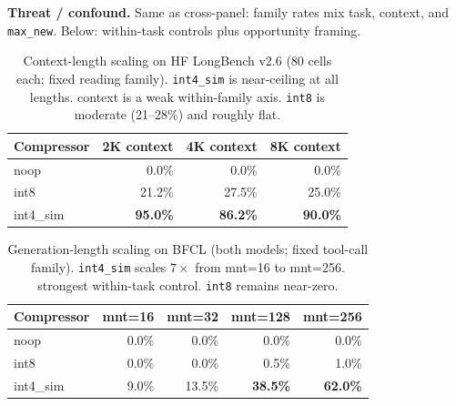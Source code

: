 \documentclass[11pt]{article}
\begin{document}
\noindent\textbf{Threat / confound.} Same as cross-panel: family rates mix task, context,
and \texttt{max\_new}. Below: within-task controls plus opportunity framing.

\begin{table}[htbp]
\centering\small\setlength\tabcolsep{4pt}
\renewcommand{\arraystretch}{1.05}
\begin{tabular}{lrrr}
\toprule
\textbf{Compressor} & \textbf{2K context} & \textbf{4K context} & \textbf{8K context} \\
\midrule
noop      &  0.0\% &  0.0\% &  0.0\% \\
int8      & 21.2\% & 27.5\% & 25.0\% \\
int4\_sim & \textbf{95.0\%} & \textbf{86.2\%} & \textbf{90.0\%} \\
\bottomrule
\end{tabular}
\caption{Context-length scaling on HF LongBench v2.6 (80 cells each; fixed reading family).
\texttt{int4\_sim} is near-ceiling at all lengths. context is a weak within-family axis.
\texttt{int8} is moderate (21--28\%) and roughly flat.}
\label{tab:ctx-scaling}
\end{table}

\begin{table}[htbp]
\centering\small\setlength\tabcolsep{4pt}
\renewcommand{\arraystretch}{1.05}
\begin{tabular}{lrrrr}
\toprule
\textbf{Compressor} & \textbf{mnt=16} & \textbf{mnt=32} & \textbf{mnt=128} & \textbf{mnt=256} \\
\midrule
noop      & 0.0\% & 0.0\% & 0.0\% & 0.0\% \\
int8      & 0.0\% & 0.0\% & 0.5\% & 1.0\% \\
int4\_sim & 9.0\% & 13.5\% & \textbf{38.5\%} & \textbf{62.0\%} \\
\bottomrule
\end{tabular}
\caption{Generation-length scaling on BFCL (both models; fixed tool-call family).
\texttt{int4\_sim} scales $7\times$ from mnt=16 to mnt=256. strongest within-task control.
\texttt{int8} remains near-zero.}
\label{tab:gen-scaling}
\end{table}
\end{document}

